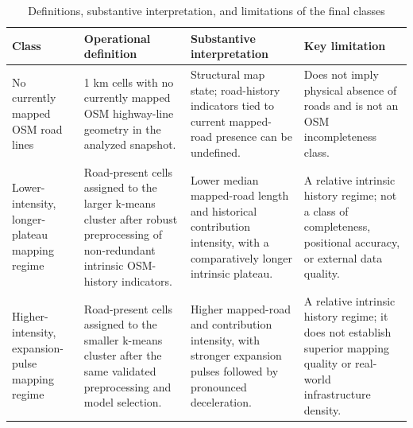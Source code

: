 \begin{table}
\caption{Definitions, substantive interpretation, and limitations of the final classes}
\label{tab:table_05_class_definitions_and_limitations}
\begin{tabular}{llll}
\toprule
Class & Operational definition & Substantive interpretation & Key limitation \\
\midrule
No currently mapped OSM road lines & 1 km cells with no currently mapped OSM highway-line geometry in the analyzed snapshot. & Structural map state; road-history indicators tied to current mapped-road presence can be undefined. & Does not imply physical absence of roads and is not an OSM incompleteness class. \\
Lower-intensity, longer-plateau mapping regime & Road-present cells assigned to the larger k-means cluster after robust preprocessing of non-redundant intrinsic OSM-history indicators. & Lower median mapped-road length and historical contribution intensity, with a comparatively longer intrinsic plateau. & A relative intrinsic history regime; not a class of completeness, positional accuracy, or external data quality. \\
Higher-intensity, expansion-pulse mapping regime & Road-present cells assigned to the smaller k-means cluster after the same validated preprocessing and model selection. & Higher mapped-road and contribution intensity, with stronger expansion pulses followed by pronounced deceleration. & A relative intrinsic history regime; it does not establish superior mapping quality or real-world infrastructure density. \\
\bottomrule
\end{tabular}
\end{table}

